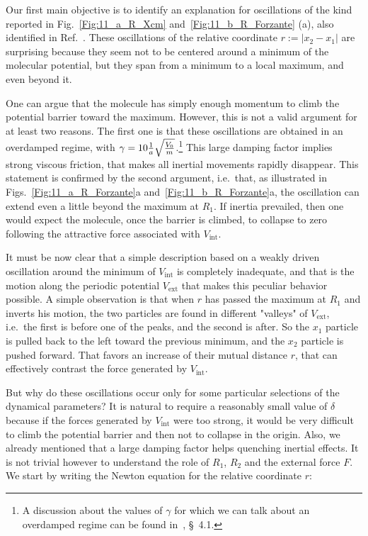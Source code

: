 Our first main objective is to identify an explanation for oscillations of the kind reported in Fig.~\ref{Fig:11_a_R_Xcm} and~\ref{Fig:11_b_R_Forzante} (a), also identified in Ref.~\cite{Cavallini}. These oscillations of the relative coordinate $r := |x_2 -x_1|$ are surprising because they seem not to be centered around a minimum of the molecular potential, but they span from a minimum to a local maximum, and even beyond it.

One can argue that the molecule has simply enough momentum to climb the potential barrier toward the maximum. However, this is not a valid argument for at least two reasons. The first one is that these oscillations are obtained in an overdamped regime, with $\gamma = 10 \frac{1}{a}\sqrt{\frac{V_0}{m}}$.\footnote{A discussion about the values of $\gamma$ for which we can talk about an overdamped regime can be found in~\cite{Cavallini}, \S~4.1.} This large damping factor implies strong viscous friction, that makes all inertial movements rapidly disappear. This statement is confirmed by the second argument, i.e.\ that, as illustrated in Figs.~\ref{Fig:11_a_R_Forzante}a and~\ref{Fig:11_b_R_Forzante}a, the oscillation can extend even a little beyond the maximum at $R_1$. If inertia prevailed, then one would expect the molecule, once the barrier is climbed, to collapse to zero following the attractive force associated with $V_\text{int}$.

It must be now clear that a simple description based on a weakly driven oscillation around the minimum of $V_\text{int}$ is completely inadequate, and that is the motion along the periodic potential $V_\text{ext}$ that makes this peculiar behavior possible. A simple observation is that when $r$ has passed the maximum at $R_1$ and inverts his motion,
the two particles are found in different "valleys" of $V_\text{ext}$, i.e.\ the first is before one of the peaks, and the second is after. So the $x_1$ particle is pulled back to the left toward the previous minimum, and the $x_2$ particle is pushed forward. That favors an increase of their mutual distance $r$, that can effectively contrast the force generated by $V_\text{int}$. %


But why do these oscillations occur only for some particular selections of the dynamical parameters? It is natural to require a reasonably small value of $\delta$ because if the forces generated by $V_\text{int}$ were too strong, it would be very difficult to climb the potential barrier and then not to collapse in the origin. Also, we already mentioned that a large damping factor helps quenching inertial effects. It is not trivial however to understand the role of $R_1$, $R_2$ and the external force $F$. We start by writing the Newton equation for the relative coordinate $r$:

